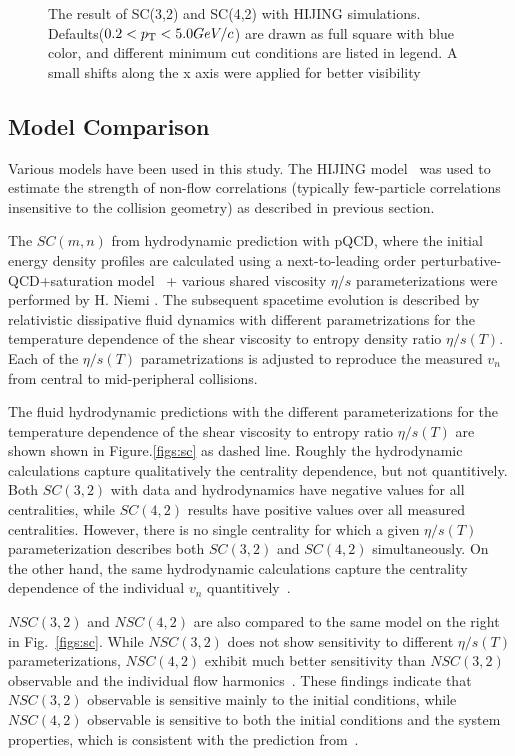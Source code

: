 \begin{figure}[h]
\begin{center}
        \caption{The result of SC(3,2) and SC(4,2) with HIJING simulations. Defaults($0.2 < p_{\rm{T}} < 5.0GeV/c$) are drawn as full square with blue color, and different minimum cut conditions are listed in legend. A small shifts along the x axis were applied for better visibility}
        \label{fig:results_HIJING}
        \end{center}   
     \end{figure}



 \subsection{Model Comparison}

Various models have been used in this study. The {HIJING} model~\cite{Wang:1991hta,Gyulassy:1994ew} was used to estimate the strength of non-flow correlations (typically few-particle correlations insensitive to the collision geometry) as described in previous section. 

The $SC(m,n)$ from hydrodynamic prediction with pQCD, where the initial energy density profiles are calculated using a next-to-leading order perturbative-QCD+saturation model~\cite{Paatelainen:2012at,Paatelainen:2013eea} + various shared viscosity $\eta/s$ parameterizations were performed by H. Niemi \cite{Niemi:2015qia}. The subsequent spacetime evolution is described by relativistic dissipative fluid dynamics with different parametrizations for the temperature dependence of the shear viscosity to entropy density ratio $\eta/s(T)$. Each of the $\eta/s(T)$ parametrizations is adjusted to reproduce the measured $v_n$ from central to mid-peripheral collisions. 

 The fluid hydrodynamic predictions with the different parameterizations for the temperature dependence of the shear viscosity to entropy ratio $\eta/s(T)$ are shown shown in Figure.\ref{figs:sc} as dashed line. Roughly the hydrodynamic calculations capture qualitatively the centrality dependence, but not quantitively. Both $SC(3,2)$ with data and hydrodynamics have negative values for all centralities, while $SC(4,2)$ results have positive values over all measured centralities. However, there is no single centrality for which a given $\eta/s(T)$ parameterization describes both $SC(3,2)$ and $SC(4,2)$ simultaneously. On the other hand, the same hydrodynamic calculations capture the centrality dependence of the individual $v_n$ quantitively~\cite{Eskola:2015uda}.

$NSC(3,2)$ and $NSC(4,2)$ are also compared to the same model on the right in Fig.~\ref{figs:sc}. 
While $NSC(3,2)$ does not show sensitivity to  different $\eta/s(T)$ parameterizations,  $NSC(4,2)$ exhibit much better sensitivity
than $NSC(3,2)$ observable and the individual flow harmonics~\cite{Niemi:2015qia}.
These findings indicate that $NSC(3,2)$ observable is sensitive mainly to the initial conditions, while $NSC(4,2)$ observable is sensitive to both the initial conditions and the system properties, which is consistent with the prediction from~\cite{Niemi:2012aj}.

